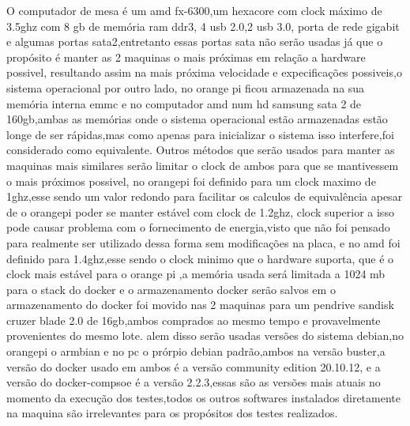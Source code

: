 \documentclass[
	12pt,				%
	openright,			%
	oneside,			%
	a4paper,			%
	english,			%
	french,				%
	spanish,			%
	brazil,				%
	]{abntex2}
\begin{document}
O computador de mesa é um amd fx-6300,um hexacore com clock máximo de 3.5ghz com 8 gb de memória ram ddr3, 4 usb 2.0,2 usb 3.0, 
porta de rede gigabit e algumas portas sata2,entretanto essas portas sata não serão usadas já que o propósito é manter as 2 maquinas o mais próximas em relação a hardware possivel,
resultando assim na mais próxima velocidade e expecificações possiveis,o sistema operacional por outro lado,
no orange pi ficou armazenada na sua memória interna emmc e no computador amd num hd samsung sata 2 de 160gb,ambas as memórias onde o sistema operacional estão armazenadas estão longe de ser rápidas,mas como apenas para inicializar o sistema isso interfere,foi considerado como equivalente.\newline
Outros métodos que serão usados para manter as maquinas mais similares serão limitar o clock de ambos para que se mantivessem o mais próximos possivel,
no orangepi foi definido para um clock maximo de 1ghz,esse sendo um valor redondo para facilitar os calculos de equivalência apesar de o orangepi poder se manter estável com clock de 1.2ghz,
clock superior a isso pode causar problema com o fornecimento de energia,visto que não foi pensado para realmente ser utilizado dessa forma sem modificações na placa, e no amd foi definido para 1.4ghz,esse sendo o clock minimo que o hardware suporta,
que é o clock mais estável para o orange pi ,a memória usada será limitada a 1024 mb para o stack do docker e o armazenamento docker serão salvos em o armazenamento do docker foi movido nas 2 maquinas para um pendrive sandisk cruzer blade 2.0 de 16gb,ambos comprados ao mesmo tempo e provavelmente provenientes do mesmo lote.\newline
alem disso serão usadas versões do sistema debian,no orangepi o armbian e no pc o prórpio debian padrão,ambos na versão buster,a versão do docker usado em ambos é a versão community edition 20.10.12,
e a versão do docker-compsoe é a versão 2.2.3,essas são as versões mais atuais no momento da execução dos testes,todos os outros softwares instalados diretamente na maquina são irrelevantes para os propósitos dos testes realizados.
\end{document}
